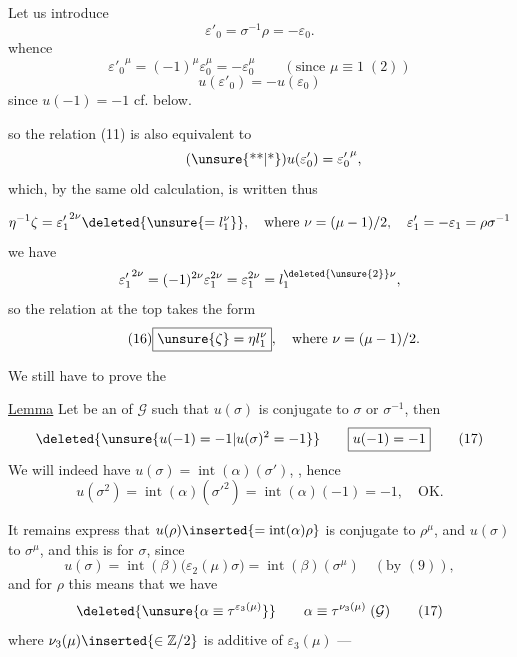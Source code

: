 Let us introduce
\[
\tag{*}
\varepsilon'_0=\sigma^{-1}\rho=-\varepsilon_0.
\]
whence
\[
{\varepsilon'_0}^{\mu}=(-1)^\mu\varepsilon_0^\mu=-\varepsilon_0^\mu
\qquad(\text{since }\mu\equiv1\;(2))
\]
\[
u(\varepsilon'_0)=-u(\varepsilon_0)
\]
since $u(-1)=-1$ cf. below.

so the relation (11) is also equivalent to
\[
\tag{\unsure{**|*}}
u(\varepsilon'_0)={\varepsilon'_0}^{\mu},
\]
which, by the same old calculation, is written thus


\[
\eta^{-1}\zeta={\varepsilon'_1}^{2\nu}\deleted{\unsure{=l_1^\nu}},
\quad\text{where }\nu=(\mu-1)/2,\quad\varepsilon'_1=-\varepsilon_1=\rho\sigma^{-1}
\]
we have
\[
{\varepsilon'_1}^{2\nu}=(-1)^{2\nu}\varepsilon_1^{2\nu}
=\varepsilon_1^{2\nu}=l_1^{\deleted{\unsure{2}}\nu},
\]
so the relation at the top takes the form
\[
\tag{16}
\boxed{\unsure{\zeta}=\eta l_1^\nu},\quad\text{where }\nu=(\mu-1)/2.
\]

We still have to prove the

\uline{Lemma} Let  be an  of $\mathcal{G}$ such that $u(\sigma)$ is conjugate  to $\sigma$ or $\sigma^{-1}$, then
\[
\deleted{\unsure{u(-1)=-1|u(\sigma)^2=-1}}
\qquad\boxed{u(-1)=-1}
\tag{17}
\]
We will indeed have $u(\sigma)=\operatorname{int}(\alpha)(\sigma')$, , hence
\[
u(\sigma^2)=\operatorname{int}(\alpha)({\sigma'}^2)
=\operatorname{int}(\alpha)(-1)=-1,\quad\text{OK.}
\]

It remains  express  that  $u(\rho)\inserted{=\operatorname{int}(\alpha)\rho}$ is conjugate to $\rho^\mu$, and $u(\sigma)$ to $\sigma^\mu$, and this is   for $\sigma$, since
\[
u(\sigma)=\operatorname{int}(\beta)\bigl(\varepsilon_2(\mu)\sigma\bigr)
=\operatorname{int}(\beta)(\sigma^\mu)\quad(\text{by }(9)),
\]
and for $\rho$ this means that we have
\[
\deleted{\unsure{\alpha\equiv\tau^{\varepsilon_3(\mu)}}}
\qquad\alpha\equiv\tau^{\nu_3(\mu)}\;(\mathcal{G})
\tag{17}
\]
where $\nu_3(\mu)\inserted{\in\mathbb{Z}/2}$ is  additive  of $\varepsilon_3(\mu)$ —

